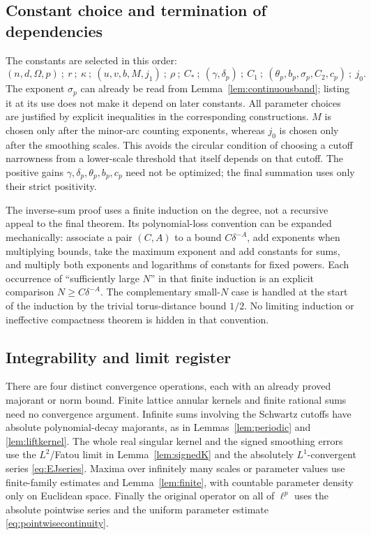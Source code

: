 \documentclass[11pt,oneside]{article}
\theoremstyle{definition}\newtheorem{definition}[theorem]{Definition}
\theoremstyle{remark}\newtheorem{remark}[theorem]{Remark}
\begin{document}
\subsection{Constant choice and termination of dependencies}
The constants are selected in this order:
\[
 (n,d,\Omega,p)\ ;\ r\ ;\ \kappa\ ;\ (u,v,b,M,j_1)\ ;\ \rho\ ;\
 C_*\ ;\ (\gamma,\delta_p)\ ;\ C_1\ ;\ (\theta_p,b_p,\sigma_p,C_2,c_p)\ ;\ j_0.
\]
The exponent $\sigma_p$ can already be read from
Lemma~\ref{lem:continuousband}; listing it at its use does not make it depend
on later constants. All parameter choices are justified by explicit
inequalities in the corresponding constructions. $M$ is chosen only after
the minor-arc counting exponents, whereas $j_0$ is chosen only after the
smoothing scales. This avoids the circular condition of choosing a cutoff
narrowness from a lower-scale threshold that itself depends on that cutoff.
The positive gains $\gamma,\delta_p,\theta_p,b_p,c_p$ need not be optimized;
the final summation uses only their strict positivity.

The inverse-sum proof uses a finite induction on the degree, not a recursive
appeal to the final theorem. Its polynomial-loss convention can be expanded
mechanically: associate a pair $(C,A)$ to a bound $C\delta^{-A}$, add
exponents when multiplying bounds, take the maximum exponent and add
constants for sums, and multiply both exponents and logarithms of constants
for fixed powers. Each occurrence of ``sufficiently large $N$'' in that
finite induction is an explicit comparison $N\geq C\delta^{-A}$.
The complementary small-$N$ case is handled at the start of the induction
by the trivial torus-distance bound $1/2$. No limiting induction or
ineffective compactness theorem is hidden in that convention.

\subsection{Integrability and limit register}
There are four distinct convergence operations, each with an already proved
majorant or norm bound. Finite lattice annular kernels and finite rational
sums need no convergence argument. Infinite sums involving the Schwartz
cutoffs have absolute polynomial-decay majorants, as in
Lemmas~\ref{lem:periodic} and \ref{lem:liftkernel}. The whole real singular
kernel and the signed smoothing errors use the $L^2$/Fatou limit in
Lemma~\ref{lem:signedK} and the absolutely $L^1$-convergent series
\eqref{eq:EJseries}. Maxima over infinitely many scales or parameter values
use finite-family estimates and Lemma~\ref{lem:finite}, with countable
parameter density only on Euclidean space. Finally the original operator
on all of $\ell^p$ uses the absolute pointwise series and the uniform
parameter estimate \eqref{eq:pointwisecontinuity}.
\end{document}
